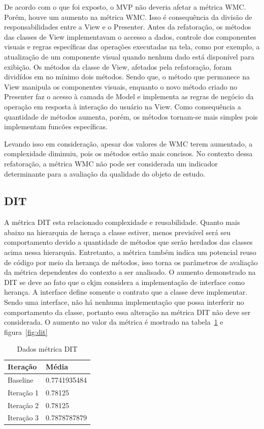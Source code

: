 De acordo com o que foi exposto, o MVP não deveria afetar a métrica WMC. Porém,
houve um aumento na métrica WMC. Isso é consequência da divisão de
responsabilidades entre a View e o Presenter. Antes da refatoração, os métodos
das classes de View implementavam o accesso a dados, controle dos componentes
visuais e regras específicas das operações executadas na tela, como por exemplo,
a atualização de um componente visual quando nenhum dado está disponível para
exibição. Os métodos da classe de View, afetados pela refatoração, foram
dividídos em no mínimo dois métodos. Sendo que, o método que permanece na View
manipula os componentes visuais, enquanto o novo método criado no Presenter faz
o acesso à camada de Model e implementa as regras de negócio da operação em
resposta à interação do usuário na View. Como consequência a quantidade de
métodos aumenta, porém, os métodos tornam-se mais simples pois implementam
funcões específicas. 

Levando isso em consideração, apesar dos valores de WMC
terem aumentado, a complexidade diminuiu, pois os métodos estão mais concisos.
No contexto dessa refatoração, a métrica WMC não pode ser considerada um
indicador determinante para a avaliação da qualidade do objeto de estudo.


\subsection{DIT}

A métrica DIT esta relacionado complexidade e reusabilidade. Quanto mais abaixo
na hierarquia de heraça a classe estiver, menos previsível será seu
comportamento devido a quantidade de métodos que serão herdados das classes
acima nessa hierarquia. Entretanto, a métrica também indica um potencial reuso
de código por meio da herança de métodos, isso torna os parâmetros de avaliação
da métrica dependentes do contexto a ser analisado. O aumento demonstrado na DIT
se deve ao fato que o ckjm considera a implementação de interface como herança.
A interface define somente o contrato que a classe deve implementar. Sendo uma
interface, não há nenhuma implementação que possa interferir no comportamento
da classe, portanto essa alteração na métrica DIT não deve ser considerada. O
aumento no valor da métrica é mostrado na tabela~\ref{tab:dit} e
figura~\ref{fig:dit}

\begin{table}[h]
	\centering
	    \caption{Dados métrica DIT}
    \begin{tabular}{ | l | l | }
    \hline
    Iteração & Média 			\\ \hline
    Baseline & 0.7741935484  	\\ \hline
    Iteração 1 & 0.78125		\\ \hline
	Iteração 2 & 0.78125			\\ \hline
	Iteração 3 & 0.7878787879	\\ \hline
    \end{tabular}
    \label{tab:dit}
\end{table}

